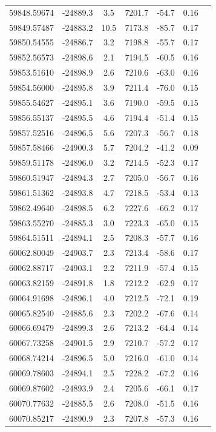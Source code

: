 \documentclass[fleqn,usenatbib,useAMS]{mnras}
\begin{document}
\begin{table}
\begin{tabular}[t]{ccccccc}
59848.59674 & -24889.3 & 3.5 & 7201.7 & -54.7 & 0.16\\
59849.57487 & -24883.2 & 10.5 & 7173.8 & -85.7 & 0.17\\ 
59850.54555 & -24886.7 & 3.2 & 7198.8 & -55.7 & 0.17\\ 
59852.56573 & -24898.6 & 2.1 & 7194.5 & -60.5 & 0.16\\ 
59853.51610 & -24898.9 & 2.6 & 7210.6 & -63.0 & 0.16\\ 
59854.56000 & -24895.8 & 3.9 & 7211.4 & -76.0 & 0.15\\ 
59855.54627 & -24895.1 & 3.6 & 7190.0 & -59.5 & 0.15\\ 
59856.55137 & -24895.5 & 4.6 & 7194.4 & -51.4 & 0.15\\ 
59857.52516 & -24896.5 & 5.6 & 7207.3 & -56.7 & 0.18\\
59857.58466 & -24900.3 & 5.7 & 7204.2 & -41.2 & 0.09\\ 
59859.51178 & -24896.0 & 3.2 & 7214.5 & -52.3 & 0.17\\ 
59860.51947 & -24894.3 & 2.7 & 7205.0 & -56.7 & 0.16\\
59861.51362 & -24893.8 & 4.7 & 7218.5 & -53.4 & 0.13\\
59862.49640 & -24898.5 & 6.2 & 7227.6 & -66.2 & 0.17\\ 
59863.55270 & -24885.3 & 3.0 & 7223.3 & -65.0 & 0.15\\ 
59864.51511 & -24894.1 & 2.5 & 7208.3 & -57.7 & 0.16\\ 
60062.80049 & -24903.7 & 2.3 & 7213.4 & -58.6 & 0.17\\ 
60062.88717 & -24903.1 & 2.2 & 7211.9 & -57.4 & 0.15\\ 
60063.82159 & -24891.8 & 1.8 & 7212.2 & -62.9 & 0.17\\ 
60064.91698 & -24896.1 & 4.0 & 7212.5 & -72.1 & 0.19\\ 
60065.82540 & -24885.6 & 2.3 & 7202.2 & -67.6 & 0.14\\ 
60066.69479 & -24899.3 & 2.6 & 7213.2 & -64.4 & 0.14\\ 
60067.73258 & -24901.5 & 2.9 & 7210.7 & -57.2 & 0.17\\ 
60068.74214 & -24896.5 & 5.0 & 7216.0 & -61.0 & 0.14\\ 
60069.78603 & -24894.1 & 2.5 & 7228.2 & -67.2 & 0.16\\ 
60069.87602 & -24893.9 & 2.4 & 7205.6 & -66.1 & 0.17\\ 
60070.77632 & -24885.5 & 2.6 & 7208.0 & -51.5 & 0.16\\ 
60070.85217 & -24890.9 & 2.3 & 7207.8 & -57.3 & 0.16\\ 

\end{tabular}
\end{table}
\end{document}
